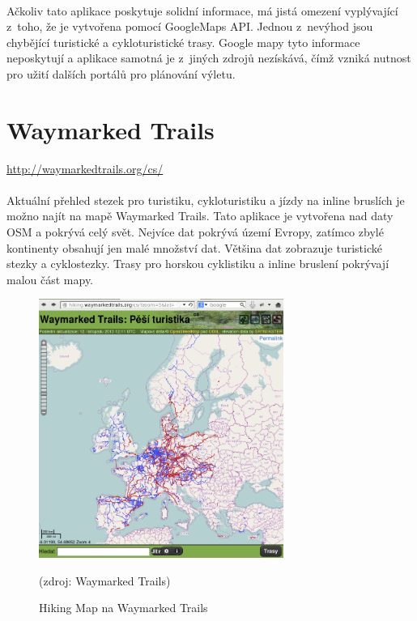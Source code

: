 \documentclass[11pt,a4paper,titlepage,oneside]{book}
\begin{document}
		\paragraph{} Ačkoliv tato aplikace poskytuje solidní informace, má jistá omezení vyplý\-vající z~toho, že je vytvořena pomocí GoogleMaps \ac{API}. Jednou z~nevýhod jsou chybějící turistické a cykloturistické trasy. Google mapy tyto informace neposkytují a aplikace samotná je z~jiných zdrojů nezískává, čímž vzniká nutnost pro užití dalších portálů pro plánování výletu.	
	
	\section{Waymarked Trails}
		\label{sec:waymarked}
		\url{http://waymarkedtrails.org/cs/}


                
		\paragraph{} Aktuální přehled stezek pro turistiku, cykloturistiku a jízdy na inline bruslích je možno najít na mapě Waymarked Trails\cite{Waymarked}. Tato aplikace je vytvořena nad daty \ac{OSM} a pokrývá celý svět. Nejvíce dat pokrývá území Evropy, zatímco zbylé kontinenty  obsahují jen malé množství dat. Většina dat zobrazuje turistické stezky a cyklostezky. Trasy pro horskou cyklistiku a inline bruslení pokrývají malou část mapy.

		\begin{figure}[!h]
			\begin{center}
				\includegraphics[width=8cm]{obrazky/waymarkedTrails.png}
				\caption{Hiking Map na Waymarked Trails}
				(zdroj: Waymarked Trails\cite{Waymarked})
			\end{center}
		\end{figure}
	
\end{document}

